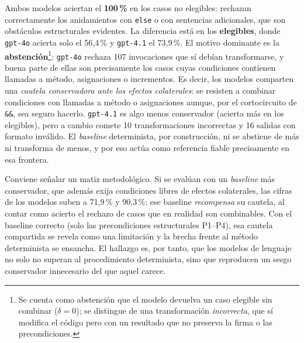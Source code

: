 Ambos modelos aciertan el \textbf{100\,\%} en los casos no elegibles: rechazan
correctamente los anidamientos con \lstinline|else| o con sentencias
adicionales, que son obstáculos estructurales evidentes. La diferencia está en
los \textbf{elegibles}, donde \texttt{gpt-4o} acierta solo el 56{,}4\,\% y
\texttt{gpt-4.1} el 73{,}9\,\%. El motivo dominante es la \textbf{abstención}\footnote{Se cuenta como
abstención que el modelo devuelva un caso elegible sin combinar ($\delta=0$);
se distingue de una transformación \emph{incorrecta}, que sí modifica el código
pero con un resultado que no preserva la firma o las precondiciones.}:
\texttt{gpt-4o} rechaza 107 invocaciones que sí debían transformarse, y buena
parte de ellas son precisamente los casos cuyas condiciones contienen llamadas
a método, asignaciones o incrementos. Es decir, los modelos comparten una
\emph{cautela conservadora ante los efectos colaterales}: se resisten a combinar
condiciones con llamadas a método o asignaciones aunque, por el cortocircuito de
\lstinline|&&|, sea seguro hacerlo. \texttt{gpt-4.1} es algo
menos conservador (acierta más en los elegibles), pero a cambio comete 10
transformaciones incorrectas y 16 salidas con formato inválido. El
\emph{baseline} determinista, por construcción, ni se abstiene de más ni
transforma de menos, y por eso actúa como referencia fiable precisamente en esa
frontera.

Conviene señalar un matiz metodológico. Si se evalúan con un \emph{baseline} más
conservador, que además exija condiciones libres de efectos colaterales, las
cifras de los modelos suben a 71{,}9\,\% y 90{,}3\,\%: ese baseline
\emph{recompensa} su cautela, al contar como acierto el rechazo de casos que en
realidad son combinables. Con el baseline correcto (solo las precondiciones
estructurales P1--P4), esa cautela compartida se revela como una limitación y la
brecha frente al método determinista se ensancha. El hallazgo es, por tanto, que
los modelos de lenguaje no solo no superan al procedimiento determinista, sino
que reproducen un sesgo conservador innecesario del que aquel carece.

